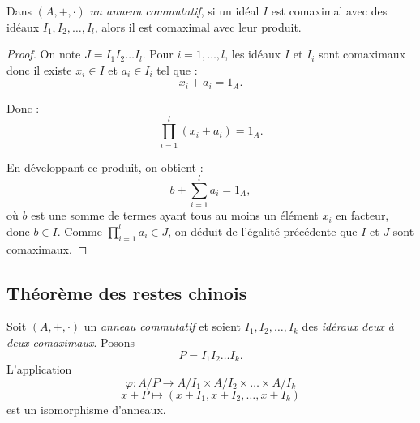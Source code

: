     \begin{lemme}
         Dans $(A,+,\cdot)$ \textit{un anneau commutatif}, si un idéal $I$ est comaximal avec des idéaux $I_1, I_2, \dots, I_l$, alors il est comaximal avec leur produit.
    \end{lemme}

\begin{proof}
    On note $J = I_1 I_2 \dots I_l$. Pour $i = 1, \dots, l$, les idéaux $I$ et $I_i$ sont comaximaux donc il existe $x_i \in I$ et $a_i \in I_i$ tel que :
\[
x_i + a_i = 1_A.
\]

Donc :
\[
\prod_{i=1}^{l} (x_i + a_i) = 1_A.
\]

En développant ce produit, on obtient :
\[
b + \sum_{i=1}^{l} a_i = 1_A,
\]
où $b$ est une somme de termes ayant tous au moins un élément $x_i$ en facteur, donc $b \in I$. Comme $\prod_{i=1}^{l} a_i \in J$, on déduit de l'égalité précédente que $I$ et $J$ sont comaximaux.
\end{proof}
\subsection{Théorème des restes chinois}


    \begin{theoreme}
        Soit $(A,+,\cdot)$ un \textit{anneau commutatif} et soient $I_1, I_2, \dots, I_k$ des \textit{idéraux deux à deux comaximaux}. Posons 
\[
P = I_1 I_2 \dots I_k.
\]
L'application 
\[
\varphi : A/P \longrightarrow A/I_1 \times A/I_2 \times \dots \times A/I_k
\]
\[
x + P \longmapsto (x + I_1, x + I_2, \dots, x + I_k)
\]
est un isomorphisme d'anneaux.
    \end{theoreme}

